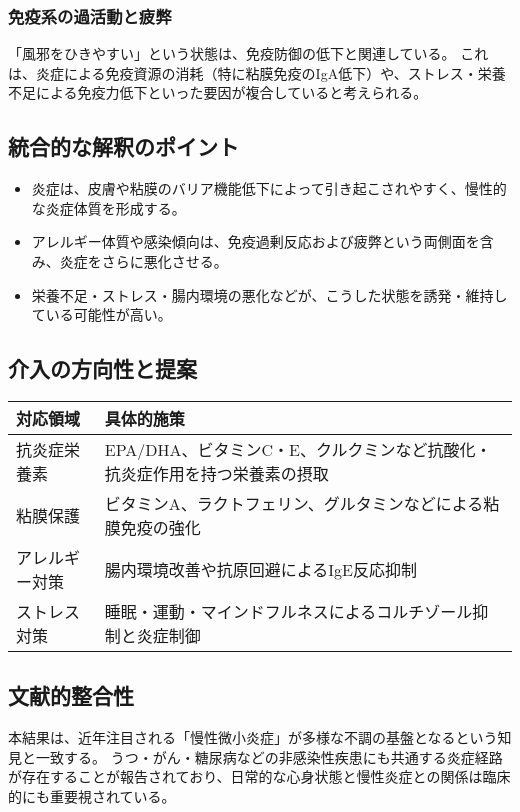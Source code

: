 \documentclass[a4paper,12pt]{article}
\begin{document}
\subsubsection*{免疫系の過活動と疲弊}

「風邪をひきやすい」という状態は、免疫防御の低下と関連している。  
これは、炎症による免疫資源の消耗（特に粘膜免疫のIgA低下）や、ストレス・栄養不足による免疫力低下といった要因が複合していると考えられる。

\subsection*{統合的な解釈のポイント}

\begin{itemize}
  \item 炎症は、皮膚や粘膜のバリア機能低下によって引き起こされやすく、慢性的な炎症体質を形成する。
  \item アレルギー体質や感染傾向は、免疫過剰反応および疲弊という両側面を含み、炎症をさらに悪化させる。
  \item 栄養不足・ストレス・腸内環境の悪化などが、こうした状態を誘発・維持している可能性が高い。
\end{itemize}

\subsection*{介入の方向性と提案}

\begin{table}[H]
\centering
\begin{tabular}{|l|p{10cm}|}
\hline
対応領域 & 具体的施策 \\
\hline
抗炎症栄養素 & EPA/DHA、ビタミンC・E、クルクミンなど抗酸化・抗炎症作用を持つ栄養素の摂取 \\
粘膜保護 & ビタミンA、ラクトフェリン、グルタミンなどによる粘膜免疫の強化 \\
アレルギー対策 & 腸内環境改善や抗原回避によるIgE反応抑制 \\
ストレス対策 & 睡眠・運動・マインドフルネスによるコルチゾール抑制と炎症制御 \\
\hline
\end{tabular}
\end{table}

\subsection*{文献的整合性}

本結果は、近年注目される「慢性微小炎症」が多様な不調の基盤となるという知見と一致する。  
うつ・がん・糖尿病などの非感染性疾患にも共通する炎症経路が存在することが報告されており、日常的な心身状態と慢性炎症との関係は臨床的にも重要視されている。
\end{document}

